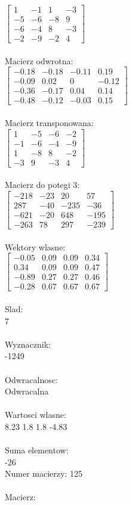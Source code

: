 \documentclass[a4paper,12pt]{article}
\begin{document}
$\begin{bmatrix} 1&-1&1&-3\\-5&-6&-8&9\\-6&-4&8&-3\\-2&-9&-2&4 \end{bmatrix}$
\\
\\
Macierz odwrotna:\\

$\begin{bmatrix} -0.18&-0.18&-0.11&0.19\\-0.09&0.02&0&-0.12\\-0.36&-0.17&0.04&0.14\\-0.48&-0.12&-0.03&0.15 \end{bmatrix}$
\\
\\
Macierz transponowana:\\

$\begin{bmatrix} 1&-5&-6&-2\\-1&-6&-4&-9\\1&-8&8&-2\\-3&9&-3&4 \end{bmatrix}$
\\
\\
Macierz do potegi 3:\\

$\begin{bmatrix} -218&-23&20&57\\287&-40&-235&-36\\-621&-20&648&-195\\-263&78&297&-239 \end{bmatrix}$
\\
\\
Wektory wlasne:\\

$\begin{bmatrix} -0.05&0.09&0.09&0.34\\0.34&0.09&0.09&0.47\\-0.89&0.27&0.27&0.46\\-0.28&0.67&0.67&0.67 \end{bmatrix}$
\\
\\
Slad:\\
7
\\
\\
Wyznacznik:\\
-1249
\\
\\
Odwracalnosc:\\
Odwracalna
\\
\\
Wartosci wlasne:\\
8.23 1.8 1.8 -4.83
\\
\\
Suma elementow:\\
-26
\\
\newpage
Numer macierzy:
125
\\
\\
Macierz:\\
\end{document}
